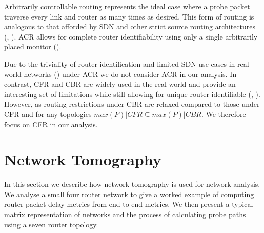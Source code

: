 Arbitrarily controllable routing represents the ideal case where a probe packet traverse every link and router as many times as desired. This form of routing is analogous to that afforded by SDN and other strict source routing architectures (\cite{university_of_southern_california_darpa_1981}, \cite{open_networking_foundation_openflow_2015}). ACR allows for complete router identifiability using only a single arbitrarily placed monitor (\cite{he_network_2021}).\par
Due to the triviality of router identification and limited SDN use cases in real world networks (\cite{jarschel_interfaces_2014}) under ACR we do not consider ACR in our analysis. In contrast, CFR and CBR are widely used in the real world and provide an interesting set of limitations while still allowing for unique router identifiable (\cite{ahuja_srlg_2011}, \cite{thomas_ldp_2001}). However, as routing restrictions under CBR are relaxed compared to those under CFR and for any topologies $max(P)|CFR \subseteq max(P)|CBR$. We therefore focus on CFR in our analysis.\par

\section{Network Tomography}
\label{sec:Bnetworktomography}
In this section we describe how network tomography is used for network analysis. We analyse a small four router network to give a worked example of computing router packet delay metrics from end-to-end metrics. We then present a typical matrix representation of networks and the process of calculating probe paths using a seven router topology.

